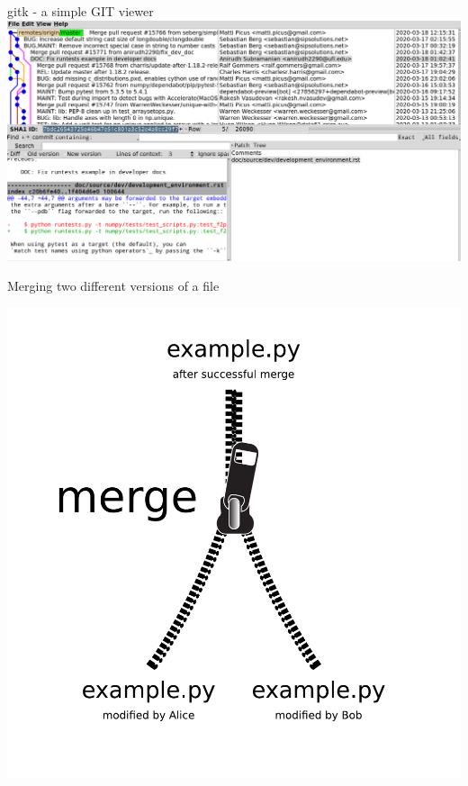 \begin{frame}[fragile]{gitk - a simple GIT viewer}
    \includegraphics[width=\textwidth]{images/gitk-screenshot-numpy.png}
\end{frame}


\begin{frame}{Merging two different versions of a file}
    \begin{center}
        \includegraphics[height=\textheight]{images/merge.pdf}
    \end{center}
\end{frame}


